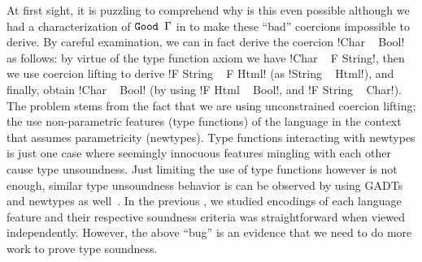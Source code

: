 \documentclass[screen,nonacm,manuscript,review]{acmart} %
\begin{document}
At first sight, it is puzzling to comprehend why is this even possible although we had a characterization of $\texttt{Good~}\Gamma$ in  to make these ``bad'' coercions impossible to derive. By careful examination, we can in fact derive the coercion !Char ~ Bool! as follows: by virtue of the type function axiom we have !Char ~ F String!, then we use coercion lifting to derive !F String ~ F Html! (as !String ~ Html!), and finally, obtain !Char ~ Bool! (by using !F Html ~ Bool!, and !F String ~ Char!). The problem stems from the fact that we are using unconstrained coercion lifting; the use non-parametric features (type functions) of the language in the context that assumes parametricity (newtypes). Type functions interacting with newtypes is just one case where seemingly innocuous features mingling with each other cause type unsoundness. Just limiting the use of type functions however is not enough, similar type unsoundness behavior is can be observed by using GADTs and newtypes as well~\cite{weirich_generative_2011}. In the previous , we studied \SFC encodings of each language feature and their respective soundness criteria was straightforward when viewed independently. However, the above ``bug'' is an evidence that we need to do more work to prove type soundness.
\end{document}
